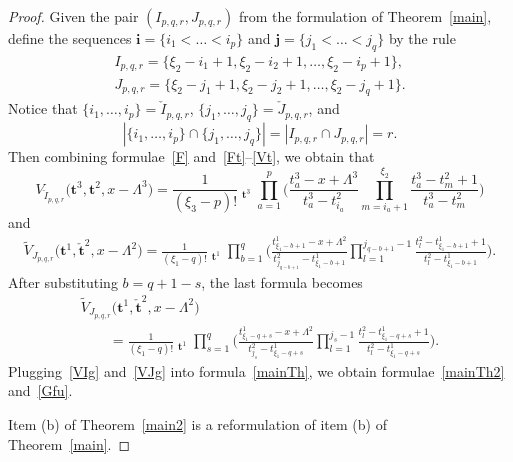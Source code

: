 \documentclass[10pt,a4paper]{amsart}
\numberwithin{equation}{section}
\DeclareMathOperator{\Symb}{\overline{Sym} }
\begin{document}
\begin{proof}
Given the pair $(I_{p,q,r},J_{p,q,r})$ from the formulation of Theorem~\ref{main}, define the sequences $\boldsymbol{i}=\{i_1<\dots<i_p\}$ and $\boldsymbol{j}=\{j_1<\dots<j_q\}$ by the rule
\begin{gather*}
I_{p,q,r}=\{\xi_2-i_1+1,\xi_2-i_2+1,\dots,\xi_2-i_p+1\},\\ J_{p,q,r}=\{\xi_2-j_1+1,\xi_2-j_2+1,\dots,\xi_2-j_q+1\}.
\end{gather*}
Notice that
$\{i_1,\dots,i_p\}=\check{I}_{p,q,r}$, $\{j_1,\dots,j_q\}=\check{J}_{p,q,r}$,
and
\begin{equation*}|\{i_1,\dots,i_p\}\cap \{j_1,\dots,j_q\}|=|I_{p,q,r}\cap J_{p,q,r}|=r.\end{equation*}
Then combining formulae~\eqref{F} and~\eqref{Ft}--\eqref{Vt}, we obtain that
\begin{equation}\label{VIg}
V_{\check{I}_{p,q,r}}\bigl(\boldsymbol{t}^3,\boldsymbol{t}^2,x-\Lambda^3\bigr)=\frac{1}{(\xi_3-p)!}\Symb_{\boldsymbol{t}^3}
\prod_{a=1}^{p} \Biggl(\frac{t^3_a-x+\Lambda^3}{t_a^3-t^2_{i_a}}\prod_{ m=i_a+1}^{\xi_2} \frac{t_a^3-t^2_m+1}{t_a^3-t^2_m}\Biggr)
\end{equation}
and
\begin{gather*}
\widetilde{V}_{J_{p,q,r}}\bigl(\boldsymbol{t}^1,\check{\boldsymbol{t}}^2,x-\Lambda^2\bigr)=\frac{1}{(\xi_1-q)!}\Symb_{\boldsymbol{t}^1}
\prod_{b=1}^{q} \Biggl( \frac{t_{\xi_1-b+1}^1-x+\Lambda^2}{t^2_{j_{q-b+1}}-t^1_{\xi_1-b+1}}\prod_{ l=1}^{j_{q-b+1}-1} \frac{t^2_l-t_{\xi_1-b+1}^1+1}{t^2_l-t^1_{\xi_1-b+1}}\Biggr).
\end{gather*}
After substituting $b=q+1-s$, the last formula becomes
\begin{gather}
\widetilde{V}_{J_{p,q,r}}\bigl(\boldsymbol{t}^1,\check{\boldsymbol{t}}^2,x-\Lambda^2\bigr)\nonumber\\
\qquad{}=\frac{1}{(\xi_1-q)!}\Symb_{\boldsymbol{t}^1}
\prod_{s=1}^{q} \Biggl( \frac{t_{\xi_1-q+s}^1-x+\Lambda^2}{t^2_{j_{s}}-t^1_{\xi_1-q+s}}\prod_{ l=1}^{j_s-1} \frac{t^2_l-t_{\xi_1-q+s}^1+1}{t^2_l-t^1_{\xi_1-q+s}}\Biggr).\label{VJg}
\end{gather}
Plugging~\eqref{VIg} and~\eqref{VJg} into formula~\eqref{mainTh}, we obtain formulae~\eqref{mainTh2} and~\eqref{Gfu}.

Item (b) of Theorem~\ref{main2} is a reformulation of item (b) of Theorem~\ref{main}.
\end{proof}
\end{document}

